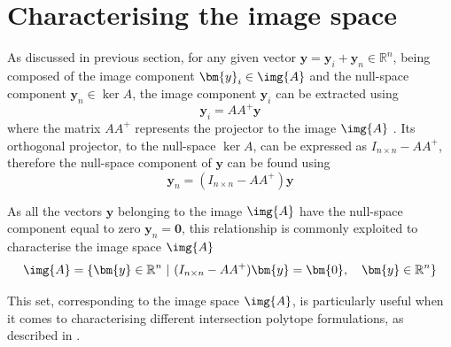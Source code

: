 \section{Characterising the image space}
\label{ch:image_char}

As discussed in previous section, for any given vector $\bm{y} = \bm{y}_i + \bm{y}_n\in\mathbb{R}^n$, being composed of the image component $\bm{y}_i\in\img{A}$ and the null-space component $\bm{y}_n\in\ker{A}$, the image component $\bm{y}_i$ can be extracted using 
\begin{equation}
    \bm{y}_i =  AA^+\bm{y}
\end{equation}
where the matrix $AA^+$ represents the projector to the image $\img{A}$ \cite[p. 430]{meyer2001Matrix}. Its orthogonal projector, to the null-space $\ker{A}$, can be expressed as $I_{n\times n} - AA^+$, therefore the null-space component of $\bm{y}$ can be found using
\begin{equation}
    \bm{y}_n = (I_{n\times n} - AA^+)\bm{y}
\end{equation}

As all the vectors $\bm{y}$ belonging to the image $\img{A}$ have the null-space component equal to zero $\bm{y}_n=\bm{0}$, this relationship is commonly exploited to characterise the image space $\img{A}$
\begin{equation}
   \img{A} = \{ \bm{y}\in\mathbb{R}^n ~|~(I_{n\times n} - AA^+)\bm{y} = \bm{0}, \quad \bm{y}\in\mathbb{R}^n \}
   \label{eq:image_poly}
\end{equation}

This set, corresponding to the image space $\img{A}$, is particularly useful when it comes to characterising different intersection polytope formulations, as described in .